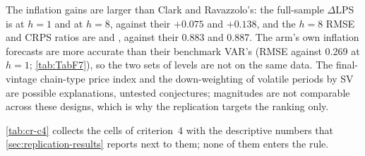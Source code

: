 The inflation gains are larger than Clark and Ravazzolo's: the full-sample $\Delta$LPS is
 at $h = 1$ and
 at $h = 8$, against their $+0.075$ and
$+0.138$, and the $h = 8$ RMSE and CRPS ratios are
 and
, against their 0.883 and 0.887.
The  arm's own inflation forecasts are more accurate than their benchmark VAR's
(RMSE  against 0.269 at $h = 1$;
\cref{tab:TabF7}), so the two sets of levels are not on the same data. The final-vintage
chain-type price index and the down-weighting of volatile periods by SV are possible explanations,
untested conjectures; magnitudes are not comparable across these designs, which is why the
replication targets the ranking only.

\cref{tab:cr-c4} collects the cells of criterion~4 with the descriptive numbers that
\cref{sec:replication-results} reports next to them; none of them enters the rule.

